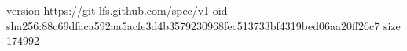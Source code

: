 version https://git-lfs.github.com/spec/v1
oid sha256:88c69dfaca592aa5acfe3d4b3579230968fec513733bf4319bed06aa20ff26c7
size 174992
